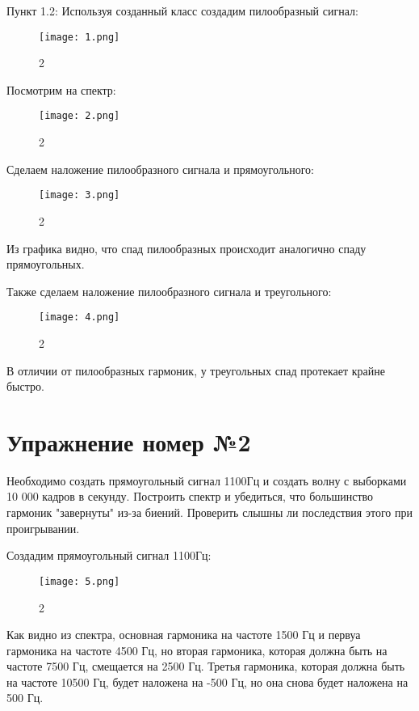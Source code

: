 \documentclass[10pt,a4paper,oneside]{article}
\begin{document}
Пункт 1.2:
Используя созданный класс создадим пилообразный сигнал: 

\begin{figure}[H]
        \centering
        \texttt{[image: 1.png]}
        \caption{2}
        \label{fig:first}
\end{figure}

Посмотрим на спектр: 

\begin{figure}[H]
        \centering
        \texttt{[image: 2.png]}
        \caption{2}
        \label{fig:first}
\end{figure}

Сделаем наложение пилообразного сигнала и прямоугольного:

\begin{figure}[H]
        \centering
        \texttt{[image: 3.png]}
        \caption{2}
        \label{fig:first}
\end{figure}

Из графика видно, что спад пилообразных происходит аналогично спаду прямоугольных.

Также сделаем наложение пилообразного сигнала и треугольного: 

\begin{figure}[H]
        \centering
        \texttt{[image: 4.png]}
        \caption{2}
        \label{fig:first}
\end{figure}

В отличии от пилообразных гармоник, у треугольных спад протекает крайне быстро.
\section{Упражнение номер №2}
Необходимо создать прямоугольный сигнал 1100Гц и создать волну с выборками 10 000 кадров в секунду.  Построить спектр и убедиться, что большинство гармоник "завернуты" из-за биений. Проверить слышны ли последствия этого при проигрывании.

Создадим прямоугольный сигнал 1100Гц: 

\begin{figure}[H]
        \centering
        \texttt{[image: 5.png]}
        \caption{2}
        \label{fig:first}
\end{figure}

Как видно из спектра, основная гармоника на частоте 1500 Гц и первуа гармоника на частоте 4500 Гц, но вторая гармоника, которая должна быть на частоте 7500 Гц, смещается на 2500 Гц. Третья гармоника, которая должна быть на частоте 10500 Гц, будет наложена на -500 Гц, но она снова будет наложена на 500 Гц.
\end{document}
